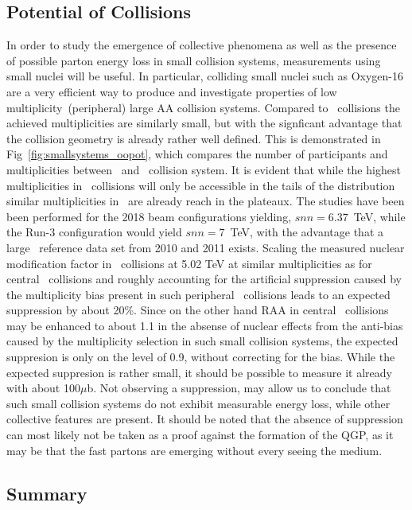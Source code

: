 \documentclass[../report.tex]{subfiles}
\def\snn{snn}
\begin{document}
\subsection{Potential of \OO Collisions}
In order to study the emergence of collective phenomena as well as the presence of possible parton energy loss in small collision systems, measurements using small nuclei will be useful.
In particular, colliding small nuclei such as Oxygen-16 are a very efficient way to produce and investigate properties of low multiplicity~(peripheral) large AA collision systems.
Compared to \pPb\ collisions the achieved multiplicities are similarly small, but with the signficant advantage that the collision geometry is already rather well defined.
This is demonstrated in Fig~\ref{fig:smallsystems_oopot}, which compares the number of participants and multiplicities between \OO\ and \pPb\ collision system.
It is evident that while the highest multiplicities in \pPb\ collisions will only be accessible in the tails of the distribution similar multiplicities in \OO\ are already reach in the plateaux.
The studies have been been performed for the 2018  beam configurations yielding, $\snn=6.37$~TeV, while the Run-3 configuration would yield $\snn=7$~TeV, with the advantage that a large \pp\ reference data set from 2010 and 2011
exists.
Scaling the measured nuclear modification factor in \PbPb\ collisions at 5.02 TeV at similar multiplicities as for central \OO\ collisions and roughly accounting for the artificial suppression caused by the multiplicity bias present in such peripheral \PbPb\ collisions leads to an expected suppression by about 20\%.
Since on the other hand RAA in central \OO\ collisions may be enhanced to about 1.1 in the absense of nuclear effects from the anti-bias caused by the multiplicity selection in such small collision systems, the expected suppresion is only on the level of 0.9, without correcting for the bias.
While the expected suppresion is rather small, it should be possible to measure it already with about 100$\mu$b.
Not observing a suppression, may allow us to conclude that such small collision systems do not exhibit measurable energy loss, while other collective features are present.
It should be noted that the absence of suppression can most likely not be taken as a proof against the formation of the QGP, as it may be that the fast partons are emerging without every seeing the medium.

\subsection{Summary}
\end{document}
